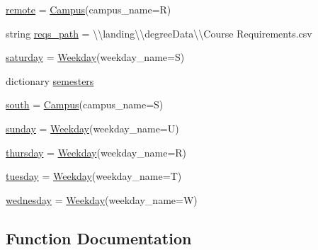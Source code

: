 \begin{DoxyCompactItemize}
\item 
\mbox{\hyperlink{namespacemavAgenda_1_1CSVPreprocessing_a405277d557b4baad33fb2e0f2fd7dc24}{remote}} = \mbox{\hyperlink{classmavAgenda_1_1landing_1_1models_1_1Campus}{Campus}}(campus\+\_\+name=\textquotesingle{}R\textquotesingle{})
\item 
string \mbox{\hyperlink{namespacemavAgenda_1_1CSVPreprocessing_acc4cb6a0d200078b9c98638956257bb1}{reqs\+\_\+path}} = \textquotesingle{}\textbackslash{}\textbackslash{}landing\textbackslash{}\textbackslash{}degree\+Data\textbackslash{}\textbackslash{}\+Course Requirements.\+csv\textquotesingle{}
\item 
\mbox{\hyperlink{namespacemavAgenda_1_1CSVPreprocessing_abd9daa930fde25e0745526e146dca121}{saturday}} = \mbox{\hyperlink{classmavAgenda_1_1landing_1_1models_1_1Weekday}{Weekday}}(weekday\+\_\+name=\textquotesingle{}S\textquotesingle{})
\item 
dictionary \mbox{\hyperlink{namespacemavAgenda_1_1CSVPreprocessing_a2ebca8434f9e001ddfb8ee05ae7cf228}{semesters}}
\item 
\mbox{\hyperlink{namespacemavAgenda_1_1CSVPreprocessing_a1b43ae026d497a500c1a9724bbef6c3c}{south}} = \mbox{\hyperlink{classmavAgenda_1_1landing_1_1models_1_1Campus}{Campus}}(campus\+\_\+name=\textquotesingle{}S\textquotesingle{})
\item 
\mbox{\hyperlink{namespacemavAgenda_1_1CSVPreprocessing_a0c32041c26fbdb8edc1589d96e46859a}{sunday}} = \mbox{\hyperlink{classmavAgenda_1_1landing_1_1models_1_1Weekday}{Weekday}}(weekday\+\_\+name=\textquotesingle{}U\textquotesingle{})
\item 
\mbox{\hyperlink{namespacemavAgenda_1_1CSVPreprocessing_aaf0e778e0fb90387108e258bacac80ea}{thursday}} = \mbox{\hyperlink{classmavAgenda_1_1landing_1_1models_1_1Weekday}{Weekday}}(weekday\+\_\+name=\textquotesingle{}R\textquotesingle{})
\item 
\mbox{\hyperlink{namespacemavAgenda_1_1CSVPreprocessing_a91a0dac68d4bca3478f4966a6b5f1c81}{tuesday}} = \mbox{\hyperlink{classmavAgenda_1_1landing_1_1models_1_1Weekday}{Weekday}}(weekday\+\_\+name=\textquotesingle{}T\textquotesingle{})
\item 
\mbox{\hyperlink{namespacemavAgenda_1_1CSVPreprocessing_a41bcd79684eee2d826705a1f2f68e722}{wednesday}} = \mbox{\hyperlink{classmavAgenda_1_1landing_1_1models_1_1Weekday}{Weekday}}(weekday\+\_\+name=\textquotesingle{}W\textquotesingle{})
\end{DoxyCompactItemize}


\subsection{Function Documentation}
\mbox{\label{namespacemavAgenda_1_1CSVPreprocessing_a55df24ef15e8110c2aa1b3413eed36f9}} 

